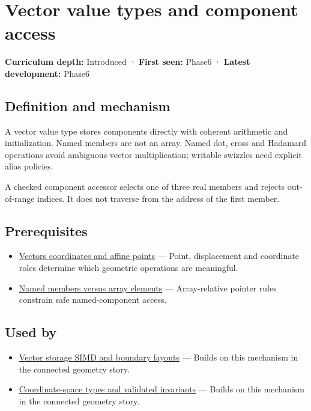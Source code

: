 \hypertarget{appendix-37a39984ba66}{}\label{referencestart:appendix-37a39984ba66}
\section{Vector value types and component access}\label{appendix-37a39984ba66-vector-value-types-and-component-access}

\textbf{Curriculum depth:} Introduced · \textbf{First seen:} Phase6 · \textbf{Latest development:} Phase6

\subsection{Definition and mechanism}\label{appendix-37a39984ba66-definition-and-mechanism}

A vector value type stores components directly with coherent arithmetic and initialization. Named members are not an array. Named dot, cross and Hadamard operations avoid ambiguous vector multiplication; writable swizzles need explicit alias policies.

A checked component accessor selects one of three real members and rejects out-of-range indices. It does not traverse from the address of the first member.

\subsection{Prerequisites}\label{appendix-37a39984ba66-prerequisites}

\begin{itemize}
\tightlist
\item
  \hyperref[appendix-0659864c0aa3]{Vectors coordinates and affine points} --- Point, displacement and coordinate roles determine which geometric operations are meaningful.
\item
  \hyperref[appendix-3f7e15effba6]{Named members versus array elements} --- Array-relative pointer rules constrain safe named-component access.
\end{itemize}

\subsection{Used by}\label{appendix-37a39984ba66-used-by}

\begin{itemize}
\tightlist
\item
  \hyperref[appendix-26bf6bf2fb8b]{Vector storage SIMD and boundary layouts} --- Builds on this mechanism in the connected geometry story.
\item
  \hyperref[appendix-380a220e2529]{Coordinate-space types and validated invariants} --- Builds on this mechanism in the connected geometry story.
\end{itemize}

